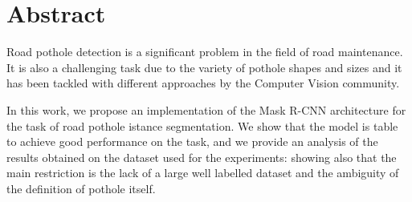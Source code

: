 \chapter*{Abstract} %
Road pothole detection is a significant problem in the field of road maintenance. It is also a challenging task due to the variety of pothole shapes and sizes and it has been tackled with different approaches by the Computer Vision community. 

In this work, we propose an implementation of the Mask R-CNN architecture for the task of road pothole istance segmentation.
We show that the model is table to achieve good performance on the task, and we provide an analysis of the results obtained on the dataset used for the experiments: showing also that the main restriction is the lack of a large well labelled dataset and the ambiguity of the definition of pothole itself.

